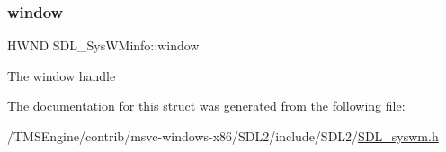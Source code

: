 \subsubsection{\texorpdfstring{window}{window}}
{\footnotesize\ttfamily H\+W\+ND S\+D\+L\+\_\+\+Sys\+W\+Minfo\+::window}

The window handle 

The documentation for this struct was generated from the following file\+:\begin{DoxyCompactItemize}
\item 
/\+T\+M\+S\+Engine/contrib/msvc-\/windows-\/x86/\+S\+D\+L2/include/\+S\+D\+L2/\hyperlink{_s_d_l__syswm_8h}{S\+D\+L\+\_\+syswm.\+h}\end{DoxyCompactItemize}
